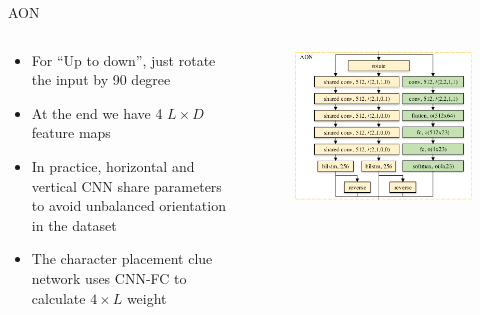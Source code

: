 \documentclass[compress]{beamer}
\begin{document}
\begin{frame}[allowframebreaks]{AON}
\begin{columns}
\begin{column}[T]{.5\textwidth}
\begin{itemize}
                \item For ``Up to down'', just rotate the input by 90 degree
                \item At the end we have 4 $L\times D$ feature maps
                \item In practice, horizontal and vertical CNN share parameters to avoid unbalanced orientation in the dataset
                \item The character placement clue network uses CNN-FC to calculate $4\times L$ weight
            \end{itemize}
        \end{column}
        \begin{column}[T]{.5\textwidth}
            \begin{figure}
                \includegraphics[width=\textwidth,height=.8\textheight]{aon}
            \end{figure}
        \end{column}
    \end{columns}
\end{frame}
\end{document}
